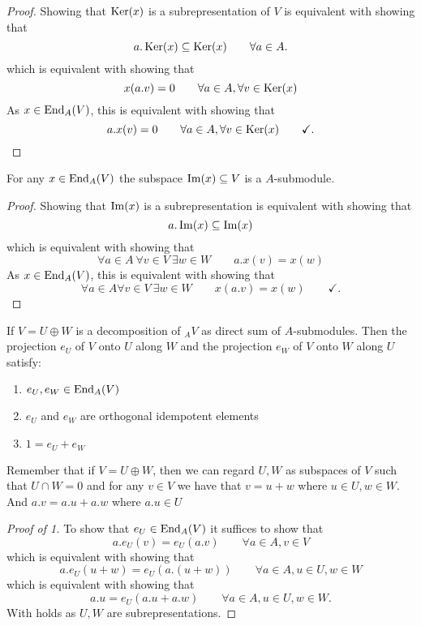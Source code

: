 \begin{proof}
Showing that \(\operatorname{Ker}(x)\) is a subrepresentation of \(V\) is equivalent with showing that
\[
a.\operatorname{Ker}(x)\subseteq \operatorname{Ker}(x) \qquad \forall a\in A.
\]
which is equivalent with showing that
\[
x(a.v)=0 \qquad \forall a\in A,\forall v\in \operatorname{Ker}(x)
\]
As \(x\in \operatorname{End}_A(V)\), this is equivalent with showing that
\[
a.x(v)=0 \qquad \forall a\in A,\forall v\in \operatorname{Ker}(x) \qquad \checkmark.
\]
\end{proof}

\begin{prop}
For any \(x\in \operatorname{End}_A(V)\) the subspace \(\operatorname{Im}(x)\subseteq V\) is a \(A\)-submodule.
\end{prop}

\begin{proof}
Showing that \(\operatorname{Im}(x)\) is a subrepresentation is equivalent with showing that
\[
a.\operatorname{Im}(x)\subseteq \operatorname{Im}(x)
\]
which is equivalent with showing that
\[
\forall a\in A\  \forall v\in V\  \exists w\in W \qquad a.x(v)=x(w) 
\]
As \(x\in \operatorname{End}_A(V)\), this is equivalent with showing that
\[
\forall a\in A\forall v\in V\  \exists w\in W \qquad x(a.v)=x(w) \qquad \checkmark. 
\]
\end{proof}

\begin{prop}
If \(V=U\oplus W\) is a decomposition of \(_AV\) as direct sum of \(A\)-submodules. Then the projection \(e_U\) of \(V\) onto \(U\) along \(W\) and the projection \(e_W\) of \(V\) onto \(W\) along \(U\) satisfy:

\begin{enumerate}
  \item \(e_U,e_W\in \operatorname{End}_A(V)\)
  \item \(e_U\) and \(e_W\) are orthogonal idempotent elements
  \item \(1=e_U+e_W\)
\end{enumerate}

\end{prop}

Remember that if \(V=U\oplus W\), then we can regard $U,W$ as subspaces of \(V\) such that \(U\cap W=0\) and for any \(v\in V\) we have that \(v=u+w\) where \(u\in U, w\in W\). And \(a.v=a.u+a.w\) where \(a.u\in U\)

\begin{proof}[Proof of 1]
To show that \(e_U\in \operatorname{End}_A(V)\) it suffices to show that
\[
a.e_U(v)= e_U(a.v) \qquad \forall a\in A,v\in V
\]
which is equivalent with showing that
\[
a.e_U(u+w)= e_U(a.(u+w)) \qquad \forall a\in A,u\in U,w\in W
\]
which is equivalent with showing that
\[
a.u= e_U(a.u+a.w) \qquad \forall a\in A,u\in U,w\in W.
\]
With holds as \(U,W\) are subrepresentations.
\end{proof}

